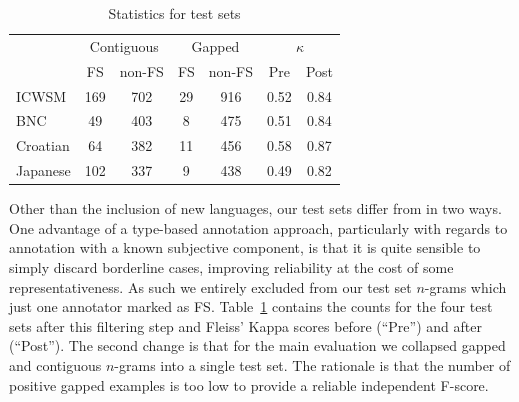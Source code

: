 \documentclass[11pt,letterpaper]{article}
\newcommand{\z}{\phantom{0}}
\newcommand{\tabref}[2][]{Table#1~\ref{#2}\xspace}
\newcommand{\secref}[2][]{Section#1~\ref{#2}\xspace}
\begin{document}
\begin{table}[!bt]
 
 \begin{center}
	 \begin{tabular}{@{}lc@{\,\,\,}cc@{\,\,\,}cc@{\,\,\,}c@{}}

       \toprule
       & \multicolumn{2}{c}{Contiguous} & \multicolumn{2}{c}{Gapped} & \multicolumn{2}{c}{$\kappa$} \\ %
       \cmidrule(lr){2-3}\cmidrule(lr){4-5}\cmidrule(lr){6-7}
			& FS & non-FS & FS & non-FS & Pre & Post \\
			 \midrule
			ICWSM    & 169  & 702 & 29 & 916 &0.52 &0.84 \\
			BNC      & \z49 & 403 & \z8& 475 &0.51 &0.84 \\
			Croatian & \z64 & 382 & 11 & 456 & 0.58 &0.87 \\
			Japanese & 102  & 337 & \z9 & 438 & 0.49 &0.82\\
       \bottomrule
 \end{tabular}
  \caption{ Statistics for test sets }
	 \label{tab:stats}

 \end{center}

 \end{table}

Other than the inclusion of new languages, our test sets differ from  in two ways. One advantage of a type-based annotation approach, particularly with regards to annotation with a known subjective component, is that it is quite sensible to simply discard borderline cases, improving reliability at the cost of some representativeness. As such we entirely excluded from our test set $n$-grams which just one annotator marked as FS. \tabref{tab:stats} contains the counts for the four test sets after this filtering step and Fleiss' Kappa scores before (``Pre'') and after (``Post'').  The second change is that for the main evaluation we collapsed gapped and contiguous $n$-grams into a single test set. The rationale is that the number of positive gapped examples is too low to provide a reliable independent F-score.

\end{document}
